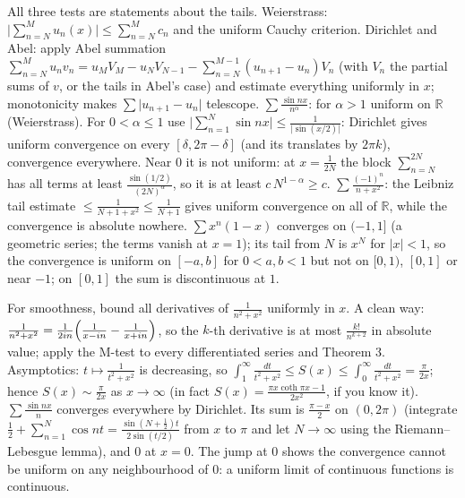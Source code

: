 \documentclass[11pt,a4paper]{article}
\begin{document}

All three tests are statements about the tails. Weierstrass: \(\bigl\lvert\sum_{n=N}^M u_n(x)\bigr\rvert\le\sum_{n=N}^M c_n\) and the uniform Cauchy criterion. Dirichlet and Abel: apply Abel summation \(\sum_{n=N}^M u_nv_n=u_MV_M-u_NV_{N-1}-\sum_{n=N}^{M-1}(u_{n+1}-u_n)V_n\) (with \(V_n\) the partial sums of \(v\), or the tails in Abel's case) and estimate everything uniformly in \(x\); monotonicity makes \(\sum\lvert u_{n+1}-u_n\rvert\) telescope.
\(\sum\frac{\sin nx}{n^\alpha}\): for \(\alpha\gt1\) uniform on \(\mathbb R\) (Weierstrass). For \(0\lt\alpha\le1\) use \(\bigl\lvert\sum_{n=1}^N\sin nx\bigr\rvert\le\frac1{\lvert\sin(x/2)\rvert}\): Dirichlet gives uniform convergence on every \([\delta,2\pi-\delta]\) (and its translates by \(2\pi k\)), convergence everywhere. Near \(0\) it is not uniform: at \(x=\frac1{2N}\) the block \(\sum_{n=N}^{2N}\) has all terms at least \(\frac{\sin(1/2)}{(2N)^\alpha}\), so it is at least \(c\,N^{1-\alpha}\ge c\).
\(\sum\frac{(-1)^n}{n+x^2}\): the Leibniz tail estimate \(\le\frac1{N+1+x^2}\le\frac1{N+1}\) gives uniform convergence on all of \(\mathbb R\), while the convergence is absolute nowhere. \(\sum x^n(1-x)\) converges on \((-1,1]\) (a geometric series; the terms vanish at \(x=1\)); its tail from \(N\) is \(x^N\) for \(\lvert x\rvert\lt1\), so the convergence is uniform on \([-a,b]\) for \(0\lt a,b\lt1\) but not on \([0,1)\), \([0,1]\) or near \(-1\); on \([0,1]\) the sum is discontinuous at \(1\).

For smoothness, bound all derivatives of \(\frac1{n^2+x^2}\) uniformly in \(x\). A clean way: \(\frac1{n^2+x^2}=\frac1{2in}\Bigl(\frac1{x-in}-\frac1{x+in}\Bigr)\), so the \(k\)-th derivative is at most \(\frac{k!}{n^{k+2}}\) in absolute value; apply the M-test to every differentiated series and Theorem 3.
Asymptotics: \(t\mapsto\frac1{t^2+x^2}\) is decreasing, so \(\int_1^\infty\frac{dt}{t^2+x^2}\le S(x)\le\int_0^\infty\frac{dt}{t^2+x^2}=\frac{\pi}{2x}\); hence \(S(x)\sim\frac{\pi}{2x}\) as \(x\to\infty\) (in fact \(S(x)=\frac{\pi x\coth\pi x-1}{2x^2}\), if you know it).
\(\sum\frac{\sin nx}n\) converges everywhere by Dirichlet. Its sum is \(\frac{\pi-x}2\) on \((0,2\pi)\) (integrate \(\frac12+\sum_{n=1}^N\cos nt=\frac{\sin(N+\frac12)t}{2\sin(t/2)}\) from \(x\) to \(\pi\) and let \(N\to\infty\) using the Riemann--Lebesgue lemma), and \(0\) at \(x=0\). The jump at \(0\) shows the convergence cannot be uniform on any neighbourhood of \(0\): a uniform limit of continuous functions is continuous.
\end{document}
